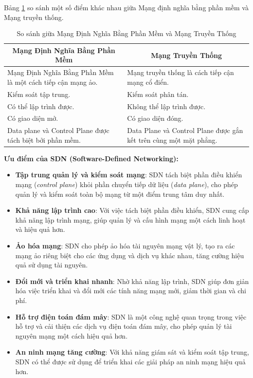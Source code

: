 \documentclass[a4paper]{article}
\begin{document}
Bảng \ref{tab:sdn_vs_traditional} so sánh một số điểm khác nhau giữa Mạng định nghĩa bằng phần mềm và Mạng truyền thống.
\begin{table}[htbp]
    \centering
    \caption{So sánh giữa Mạng Định Nghĩa Bằng Phần Mềm và Mạng Truyền Thống}
    \label{tab:sdn_vs_traditional}
    \addvspace{0.3cm} %
    \begin{tabular}{|p{7cm}|p{7cm}|}
        \hline
        \multicolumn{1}{|c|}{\textbf{Mạng Định Nghĩa Bằng Phần Mềm}} & \multicolumn{1}{c|}{\textbf{Mạng Truyền Thống}} \\
        \hline
        Mạng Định Nghĩa Bằng Phần Mềm là một cách tiếp cận mạng ảo. & Mạng truyền thống là cách tiếp cận mạng cổ điển. \\
        \hline
        Kiểm soát tập trung. & Kiểm soát phân tán. \\
        \hline
        Có thể lập trình được. & Không thể lập trình được. \\
        \hline
        Có giao diện mở. & Có giao diện đóng. \\
        \hline
        Data plane và Control Plane được tách biệt bởi phần mềm. & Data Plane và Control Plane được gắn kết trên cùng một mặt phẳng. \\
        \hline
    \end{tabular}
\end{table}

\textbf{Ưu điểm của SDN (Software-Defined Networking):}
\begin{itemize}
    \item \textbf{Tập trung quản lý và kiểm soát mạng}: SDN tách biệt phần điều khiển mạng (\textit{control plane}) khỏi phần chuyển tiếp dữ liệu (\textit{data plane}), cho phép quản lý và kiểm soát toàn bộ mạng từ một điểm trung tâm duy nhất.
    \item \textbf{Khả năng lập trình cao}: Với việc tách biệt phần điều khiển, SDN cung cấp khả năng lập trình mạng, giúp quản lý và cấu hình mạng một cách linh hoạt và hiệu quả hơn.
    \item \textbf{Ảo hóa mạng}: SDN cho phép ảo hóa tài nguyên mạng vật lý, tạo ra các mạng ảo riêng biệt cho các ứng dụng và dịch vụ khác nhau, tăng cường hiệu quả sử dụng tài nguyên.
    \item \textbf{Đổi mới và triển khai nhanh}: Nhờ khả năng lập trình, SDN giúp đơn giản hóa việc triển khai và đổi mới các tính năng mạng mới, giảm thời gian và chi phí.
    \item \textbf{Hỗ trợ điện toán đám mây}: SDN là một công nghệ quan trọng trong việc hỗ trợ và cải thiện các dịch vụ điện toán đám mây, cho phép quản lý tài nguyên mạng một cách hiệu quả hơn.
    \item \textbf{An ninh mạng tăng cường}: Với khả năng giám sát và kiểm soát tập trung, SDN có thể được sử dụng để triển khai các giải pháp an ninh mạng hiệu quả hơn.
\end{itemize}
\end{document}
